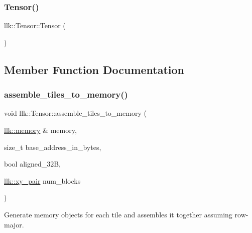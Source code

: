 \mbox{\label{classllk_1_1Tensor_a34c1f8340785e0e96d44cb69a8f85d89}} 
\subsubsection{\texorpdfstring{Tensor()}{Tensor()}\hspace{0.1cm}{\footnotesize\ttfamily [8/8]}}
{\footnotesize\ttfamily llk\+::\+Tensor\+::\+Tensor (\begin{DoxyParamCaption}{ }\end{DoxyParamCaption})}



\subsection{Member Function Documentation}
\mbox{\label{classllk_1_1Tensor_a67d54430c95a5e279516a9470bc8f8fe}} 
\subsubsection{\texorpdfstring{assemble\+\_\+tiles\+\_\+to\+\_\+memory()}{assemble\_tiles\_to\_memory()}}
{\footnotesize\ttfamily void llk\+::\+Tensor\+::assemble\+\_\+tiles\+\_\+to\+\_\+memory (\begin{DoxyParamCaption}\item[{\hyperlink{classllk_1_1memory}{llk\+::memory} \&}]{memory,  }\item[{size\+\_\+t}]{base\+\_\+address\+\_\+in\+\_\+bytes,  }\item[{bool}]{aligned\+\_\+32B,  }\item[{\hyperlink{structllk_1_1xy__pair}{llk\+::xy\+\_\+pair}}]{num\+\_\+blocks }\end{DoxyParamCaption})}



Generate memory objects for each tile and assembles it together assuming row-\/major. 

\mbox{\label{classllk_1_1Tensor_a8204b63ee3d6b146c4346fbc7727f99c}} 
